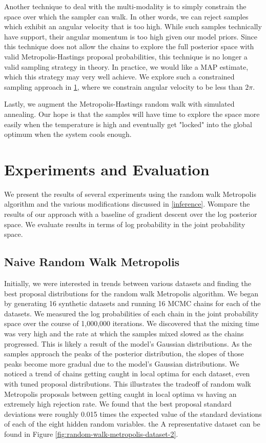 \documentclass[runningheads]{llncs}
\begin{document}
Another technique to deal with the multi-modality is to simply constrain the 
space over which the sampler can walk. In other words, we can reject samples 
which exhibit an angular velocity that is too high. While such samples 
technically have support, their angular momentum is too high given our model 
priors. Since this technique does not allow the chains to explore the full 
posterior space with valid Metropolis-Hastings proposal probabilities, this 
technique is no longer a valid sampling strategy in theory. In practice, we 
would like a MAP estimate, which this strategy may very well achieve. We explore such a 
constrained sampling approach in 
\ref{experiments-eval}, where we constrain angular velocity to be less than $2\pi$.

Lastly, we augment the Metropolis-Hastings random walk with simulated annealing. 
Our hope is that the samples will have time to explore the space more easily 
when the temperature is high and eventually get "locked" into the global 
optimum when the system cools enough.

\section{Experiments and Evaluation}
\label{experiments-eval}

We present the results of several experiments using the random walk 
Metropolis algorithm and the various modifications discussed in \ref{inference}. 
Wompare the results of our approach with a baseline of gradient descent over 
the log posterior space. We evaluate results in terms of log probability in the 
joint probability space.

\subsection{Naive Random Walk Metropolis}
\label{random-walk-metropolis}

Initially, we were interested in trends between various datasets and finding 
the best proposal distributions for the random walk Metropolis algorithm. We 
began by generating 16 synthetic datasets and running 16 MCMC chains for each 
of the datasets. We measured the log probabilities of each chain in the joint 
probability space over the course of 1,000,000 iterations. We discovered that the 
mixing time was very high and the rate at which the samples mixed slowed as the 
chains progressed. This is likely a result of the model's Gaussian distributions. 
As the samples approach the peaks of the posterior distribution, the slopes of 
those peaks become more gradual due to the model's Gaussian distributions. We 
noticed a trend of chains getting 
caught in local optima for each dataset, even with tuned proposal distributions. 
This illustrates the tradeoff of random walk Metropolis proposals between 
getting caught in local optima vs having an extremely high rejection rate. We 
found that the best proposal standard deviations were roughly 0.015 times the 
expected value of the standard deviations of each of the eight hidden random 
variables. the A 
representative dataset can be found in Figure \ref{fig:random-walk-metropolis-dataset-2}.
\end{document}
